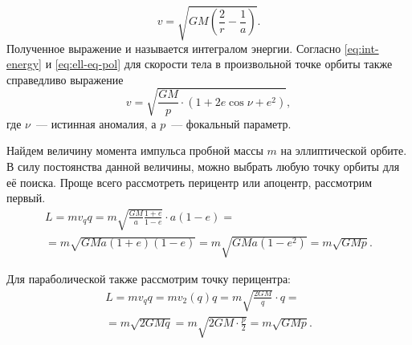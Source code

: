 \begin{equation}
    v = \sqrt{ GM \left( \frac{2}{r} - \frac{1}{a} \right)}.
    \label{eq:int-energy}
\end{equation}
Полученное выражение и называется интегралом энергии. Согласно \eqref{eq:int-energy} и \eqref{eq:ell-eq-pol} для скорости тела в произвольной точке орбиты также справедливо выражение
\begin{equation}
    v = \sqrt{\frac{GM}{p}\cdot(1 + 2 e \cos \nu + e^2)},
\end{equation}
где $\nu$~--- истинная аномалия, а $p$~--- фокальный параметр.

Найдем величину момента импульса пробной массы $m$ на эллиптической орбите. В силу постоянства данной величины, можно выбрать любую точку орбиты для её поиска. Проще всего рассмотреть перицентр или апоцентр, рассмотрим первый.
\begin{multline*}
    L
    = m v_q q
    = m \sqrt{\frac{GM}{a} \frac{1+e}{1-e}} \cdot a(1-e) =\\
    = m \sqrt{GMa (1 + e)(1-e)}
    = m \sqrt{GMa(1-e^2)}
    = m \sqrt{GMp}.
\end{multline*}

Для параболической также рассмотрим точку перицентра:
\begin{multline*}
    L
    = m v_q q
    = m v_2(q) q
    = m \sqrt{\frac{2GM}{q}} \cdot q =\\
    = m \sqrt{2GMq}
    = m \sqrt{2GM \cdot \frac{p}{2}}
    = m \sqrt{GMp}.
\end{multline*}

